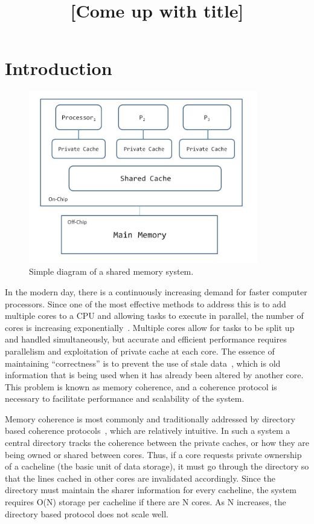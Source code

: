 \documentclass[12pt]{article}
\title{[Come up with title]}
\date{}
\begin{document}
	\maketitle


\section{Introduction}

\begin{figure}
\begin{center}
  \includegraphics[width=10cm]{distributed_system.JPG}
  \caption{Simple diagram of a shared memory system.}
  \label{fig:distributed}
\end{center}
\end{figure}


In the modern day, there is a continuously increasing demand for 
faster computer processors. Since one of the most effective methods to 
address this is to add multiple cores to a CPU and allowing tasks to 
execute in parallel, the number of cores is increasing 
exponentially~\cite{tilera, xeonphi}. 
% 
Multiple cores allow for tasks to be split up and handled 
simultaneously, but accurate and efficient performance requires 
parallelism and exploitation of private cache at each core.  The 
essence of maintaining ``correctness'' is to prevent the use of stale 
data~\cite{lamport1978}, which is old information that is being used 
when it has already been altered by another core. This problem is 
known as memory coherence, and a coherence protocol is necessary to 
facilitate performance and scalability of the system.

Memory coherence is most commonly and traditionally addressed by 
directory based coherence protocols~\cite{censier1978, tang1976}, 
which are relatively intuitive. In such a system a central directory
tracks the coherence between the private caches, or how they are being
owned or shared between cores. Thus, if a core requests private
ownership of a cacheline (the basic unit of data storage), it must
go through the directory so that the lines cached in other cores are 
invalidated accordingly. Since the directory must maintain the sharer 
information for every cacheline, the system requires O(N) storage per 
cacheline if there are N cores.  As N increases, the directory based 
protocol does not scale well.
\end{document}
